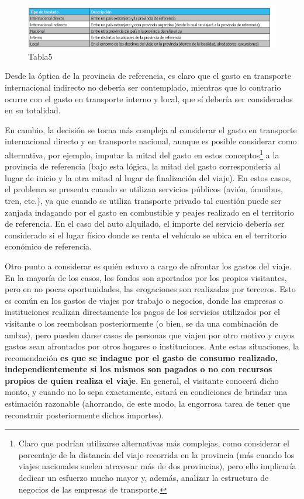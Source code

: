 \documentclass[
]{book}
\begin{document}
\begin{figure}
\includegraphics[width=1\linewidth]{imagenes/tabla_5} \caption{Tabla5}\label{fig:Tipodetraslado}
\end{figure}

Desde la óptica de la provincia de referencia, es claro que el gasto en transporte internacional indirecto no debería ser contemplado, mientras que lo contrario ocurre con el gasto en transporte interno y local, que sí debería ser considerados en su totalidad.

En cambio, la decisión se torna más compleja al considerar el gasto en transporte internacional directo y en transporte nacional, aunque es posible considerar como alternativa, por ejemplo, imputar la mitad del gasto en estos conceptos\footnote{Claro que podrían utilizarse alternativas más complejas, como considerar el porcentaje de la distancia del viaje recorrida en la provincia (más cuando los viajes nacionales suelen atravesar más de dos provincias), pero ello implicaría dedicar un esfuerzo mucho mayor y, además, analizar la estructura de negocios de las empresas de transporte.} a la provincia de referencia (bajo esta lógica, la mitad del gasto correspondería al lugar de inicio y la otra mitad al lugar de finalización del viaje). En estos casos, el problema se presenta cuando se utilizan servicios públicos (avión, ómnibus, tren, etc.), ya que cuando se utiliza transporte privado tal cuestión puede ser zanjada indagando por el gasto en combustible y peajes realizado en el territorio de referencia. En el caso del auto alquilado, el importe del servicio debería ser considerado si el lugar físico donde se renta el vehículo se ubica en el territorio económico de referencia.

Otro punto a considerar es quién estuvo a cargo de afrontar los gastos del viaje. En la mayoría de los casos, los fondos son aportados por los propios visitantes, pero en no pocas oportunidades, las erogaciones son realizadas por terceros. Esto es común en los gastos de viajes por trabajo o negocios, donde las empresas o instituciones realizan directamente los pagos de los servicios utilizados por el visitante o los reembolsan posteriormente (o bien, se da una combinación de ambas), pero pueden darse casos de personas que viajen por otro motivo y cuyos gastos sean afrontados por otros hogares o instituciones. Ante estas situaciones, la recomendación \textbf{es que se indague por el gasto de consumo realizado, independientemente si los mismos son pagados o no con recursos propios de quien realiza el viaje}. En general, el visitante conocerá dicho monto, y cuando no lo sepa exactamente, estará en condiciones de brindar una estimación razonable (ahorrando, de este modo, la engorrosa tarea de tener que reconstruir posteriormente dichos importes).
\end{document}

